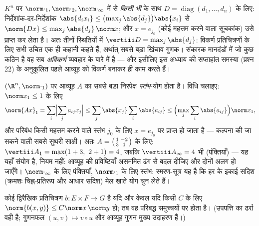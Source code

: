 \begin{example}[विकर्ण संकारक हर मानदंड को एक-सा देखते हैं]\label{ex:b2:nvs:diagonalnorm}
$K^n$ पर $\norm\cdot_1, \norm\cdot_2,
\norm\cdot_\infty$ में से \emph{किसी भी}  के साथ $D = \operatorname{diag}(d_1, \dots, d_n)$ के लिए: निर्देशांक-दर-निर्देशांक
$\abs{d_ix_i} \leq
\bigl(\max_j\abs{d_j}\bigr)\abs{x_i}$ से $\norm{Dx} \leq \max_j\abs{d_j}\,\norm x$; और $x = e_{j_0}$ (कोई महत्तम करने वाला सूचकांक) उसे प्राप्त कर लेता
है। अतः तीनों स्थितियों में $\vertiii D =
\max_j\abs{d_j}$: विकर्ण प्रतिचित्रणों के लिए सभी उचित
 एक ही कहानी कहते हैं, अर्थात् सबसे बड़ा खिंचाव गुणक। संकारक
मानदंडों में जो कुछ कठिन है वह सब \emph{अविकर्ण} व्यवहार के बारे में है
--- और इसीलिए इस अध्याय की सप्ताहांत समस्या (प्रश्न 22) के अनुकूलित
 पहले आव्यूह को विकर्ण बनाकर ही काम करते हैं।
\end{example}

\begin{example}\label{ex:b2:nvs:columnsums}
$(\R^n, \norm\cdot_1)$ पर आव्यूह $A$ का  सबसे बड़ा निरपेक्ष \emph{स्तंभ}-योग
होता है। विधि चलाइए: $\norm x_1 \leq 1$ के लिए
\[
\norm{Ax}_1 = \sum_i\Bigl|\sum_j a_{ij}x_j\Bigr|
\leq \sum_j \abs{x_j}\sum_i\abs{a_{ij}}
\leq \Bigl(\max_j\sum_i\abs{a_{ij}}\Bigr)\norm x_1 ,
\]
और परिबंध किसी महत्तम करने वाले स्तंभ $j_0$ के लिए $x = e_{j_0}$ पर प्राप्त हो
जाता है --- कल्पना की जा सकने वाली सबसे सुथरी साक्षी। अतः $A =
\begin{psmallmatrix}1 & -2\\ 3 & 1\end{psmallmatrix}$ के लिए:
$\vertiii A_1 = \max(1 + 3,\ 2 + 1) = 4$, जबकि $\vertiii A_\infty = 4$ भी (पंक्तियाँ) --- यह यहाँ संयोग है, नियम नहीं: आव्यूह
की प्रविष्टियाँ असममित ढंग से बदल दीजिए और दोनों  अलग हो जाएँगे।
$\norm\cdot_\infty$ के लिए पंक्तियाँ, $\norm\cdot_1$ के लिए स्तंभ: स्मरण-सूत्र यह है कि हर
 के इकाई सदिश (क्रमशः चिह्न-प्रतिरूप और आधार सदिश) मेल खाते योग
चुन लेते हैं।
\end{example}

\begin{proposition}[द्विरैखिक प्रतिचित्रण]\label{prop:b2:nvs:bilinear}
कोई द्विरैखिक प्रतिचित्रण $b \colon E \times F \to G$  है यदि और केवल यदि किसी $C$ के लिए
$\norm{b(x,y)} \leq C\norm x\,\norm y$ हो; तब वह परिबद्ध समुच्चयों पर  होता है। (उपपत्ति का ढर्रा
वही है; गुणनफल $(u, v) \mapsto v \circ u$ और आव्यूह गुणन मुख्य उदाहरण हैं।)
\end{proposition}

